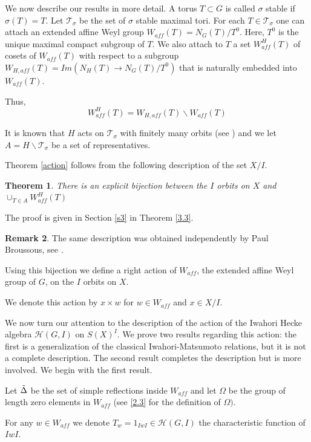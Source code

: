 \documentclass[12pt]{article}
\newcommand{\h}{\mathcal{H}(G,I)}
\newcommand{\<}{\langle}
\renewcommand{\>}{\rangle}
\theoremstyle{plain}
\newtheorem{theorem}{Theorem}[section] %
\theoremstyle{definition}
\newtheorem{Remark}[theorem]{Remark}
\begin{document}
We now describe our results in more detail. 
A torus $T \subset G$ is called $\sigma$ stable if $\sigma(T)=T$. Let $\mathcal{T}_\sigma$ be the set of $\sigma$ stable maximal tori. For each $T\in \mathcal{T}_\sigma$ one can attach an extended affine Weyl group $W_{aff}(T)=N_{G}(T)/T^{0}$. Here, $T^0$ is the unique maximal compact subgroup of $T$. We also attach to $T$ a set $W^H_{aff}(T)$ of cosets of $W_{aff}(T)$ with respect to a subgroup $W_{H,aff}(T)=Im(N_H(T)\rightarrow N_G(T)/T^0)$  that is naturally embedded into $W_{aff}(T)$. 

Thus, 
$$W^H_{aff}(T)=W_{H,aff}(T)\backslash W_{aff}(T)$$


It is known that $H$ acts on $\mathcal{T}_\sigma$ with finitely many orbits (see \cite{Helminck}) and we let $A=H\backslash \mathcal{T}_\sigma$ be a set of representatives.

Theorem \ref{action} follows from the following description of the set $X/I$.
\label{1.2}
\begin{theorem}
 There is an explicit bijection between the $I$ orbits on $X$ and $\cup_{T\in A} W^H_{aff}(T)$
\end{theorem}

The proof is given in Section \ref{s3} in Theorem \ref{3.3}.

\begin{Remark}
    The same description was obtained independently by Paul Broussous, see \cite{paul2024orbitssymmetricsubgroupbruhattits}.
\end{Remark}

Using this bijection we define a right action of $W_{aff}$, the extended affine Weyl group of $G$, on the $I$ orbits on $X$. 

We denote this action by $x\times w$ for $w\in W_{aff}$ and $x\in X/I$.

We now turn our attention to the description of the action of the Iwahori Hecke algebra $\mathcal{H}(G,I)$ on $S(X)^I$.
We prove two results regarding this action: the first is a generalization of the classical Iwahori-Matsumoto relations, but it is not a complete description. The second result completes the description but is more involved.
We begin with the first result.

Let $\Tilde{\Delta}$ be the set of simple reflections inside $W_{aff}$ and let $\Omega$ be the group of length zero elements in $W_{aff}$ (see \ref{2.3} for the definition of $\Omega)$.

For any $w\in W_{aff}$ we denote $T_w=1_{IwI}\in \h$ the characteristic function of $IwI$.
\end{document}
